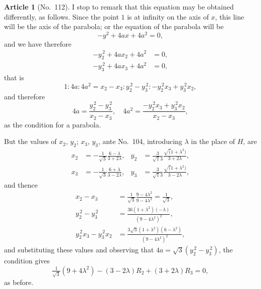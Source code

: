 \documentclass[11pt,a4paper]{article}
\theoremstyle{definition}
\newtheorem{art}{Article}
\begin{document}
\begin{art}[No.~112]
I stop to remark that this equation may be obtained differently, as follows. Since the point $1$ is at infinity on the axis of $x$, this line will be the axis of the parabola; or the equation of the parabola will be
\[
-y^2 + 4ax + 4a^2 = 0,
\]
and we have therefore
\begin{align*}
-y_2^{\,2} + 4ax_2 + 4a^2 &= 0,\\
-y_3^{\,2} + 4ax_3 + 4a^2 &= 0,
\end{align*}
that is
\[
1 : 4a : 4a^2 = x_2 - x_3 : y_2^{\,2} - y_3^{\,2} : -y_2^{\,2}x_3 + y_3^{\,2}x_2,
\]
and therefore
\[
4a = \frac{y_2^{\,2} - y_3^{\,2}}{x_2 - x_3}, \quad 4a^2 = \frac{-y_2^{\,2}x_3 + y_3^{\,2}x_2}{x_2 - x_3},
\]
as the condition for a parabola.

But the values of $x_2$, $y_2$; $x_3$, $y_3$, ante No.~104, introducing $\lambda$ in the place of $H$, are
\begin{align*}
x_2 &= -\frac{1}{\surd 3}\frac{6 - \lambda}{3 + 2\lambda}, & y_2 &= \frac{3}{\surd 13}\frac{\surd(1 + \lambda^2)}{3 + 2\lambda},\\
x_3 &= -\frac{1}{\surd 3}\frac{6 + \lambda}{3 - 2\lambda}, & y_3 &= \frac{3}{\surd 13}\frac{\surd(1 + \lambda^2)}{3 - 2\lambda},
\end{align*}
and thence
\begin{align*}
x_2 - x_3 &= \frac{1}{\surd 3}\frac{9 - 4\lambda^2}{9 - 4\lambda^2} = \frac{1}{\surd 3},\\
y_2^{\,2} - y_3^{\,2} &= \frac{36(1 + \lambda^2)(-\lambda)}{(9 - 4\lambda^2)^2},\\
y_2^{\,2}x_3 - y_3^{\,2}x_2 &= \frac{3\surd 3(1 + \lambda^2)(6 - \lambda^2)}{(9 - 4\lambda^2)^2},
\end{align*}
and substituting these values and observing that $4a = \surd 3(y_2^{\,2} - y_3^{\,2})$, the condition gives
\[
\tfrac{1}{\surd 3}(9 + 4\lambda^2) - (3 - 2\lambda)R_2 + (3 + 2\lambda)R_3 = 0,
\]
as before.
\end{art}
\end{document}
